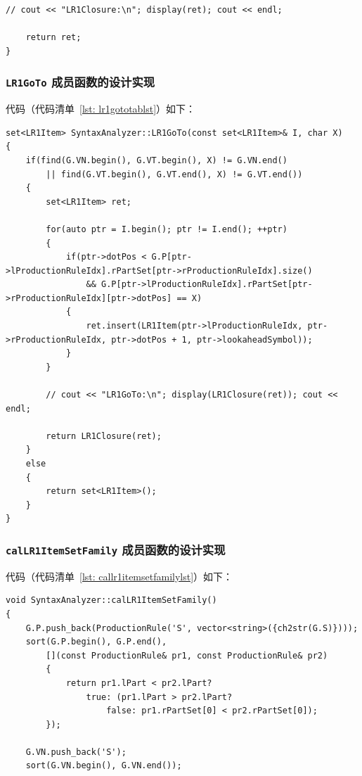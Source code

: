 \documentclass{article}
\begin{document}
\begin{CJK*}{UTF8}{gbsn}
\begin{center}
\begin{lstlisting}[caption = {\texttt{LR1Closure} 成员函数代码清单}, label = {lst: lr1closurelst}]
	// cout << "LR1Closure:\n"; display(ret); cout << endl;

	return ret;
}
\end{lstlisting}
\end{center}

\subsubsection{\texttt{LR1GoTo} 成员函数的设计实现}
代码（代码清单~\ref{lst: lr1gototablst}）如下：
\begin{center}
\begin{lstlisting}[caption = {\texttt{LR1GoTo} 成员函数代码清单}, label = {lst: lr1gototablst}]
set<LR1Item> SyntaxAnalyzer::LR1GoTo(const set<LR1Item>& I, char X)
{
	if(find(G.VN.begin(), G.VT.begin(), X) != G.VN.end()
		|| find(G.VT.begin(), G.VT.end(), X) != G.VT.end())
	{
		set<LR1Item> ret;

		for(auto ptr = I.begin(); ptr != I.end(); ++ptr)
		{
			if(ptr->dotPos < G.P[ptr->lProductionRuleIdx].rPartSet[ptr->rProductionRuleIdx].size()
				&& G.P[ptr->lProductionRuleIdx].rPartSet[ptr->rProductionRuleIdx][ptr->dotPos] == X)
			{
				ret.insert(LR1Item(ptr->lProductionRuleIdx, ptr->rProductionRuleIdx, ptr->dotPos + 1, ptr->lookaheadSymbol));
			}
		}

		// cout << "LR1GoTo:\n"; display(LR1Closure(ret)); cout << endl;
		
		return LR1Closure(ret);
	}
	else
	{
		return set<LR1Item>();
	}
}
\end{lstlisting}
\end{center}

\subsubsection{\texttt{calLR1ItemSetFamily} 成员函数的设计实现}
代码（代码清单~\ref{lst: callr1itemsetfamilylst}）如下：
\begin{center}
\begin{lstlisting}[caption = {\texttt{calLR1ItemSetFamily}代码清单}, label = {lst: callr1itemsetfamilylst}]
void SyntaxAnalyzer::calLR1ItemSetFamily()
{
	G.P.push_back(ProductionRule('S', vector<string>({ch2str(G.S)})));
	sort(G.P.begin(), G.P.end(),
		[](const ProductionRule& pr1, const ProductionRule& pr2)
		{
			return pr1.lPart < pr2.lPart?
				true: (pr1.lPart > pr2.lPart?
					false: pr1.rPartSet[0] < pr2.rPartSet[0]);
		});

	G.VN.push_back('S');
	sort(G.VN.begin(), G.VN.end());


\end{lstlisting}
\end{center}
\end{CJK*}
\end{document}
